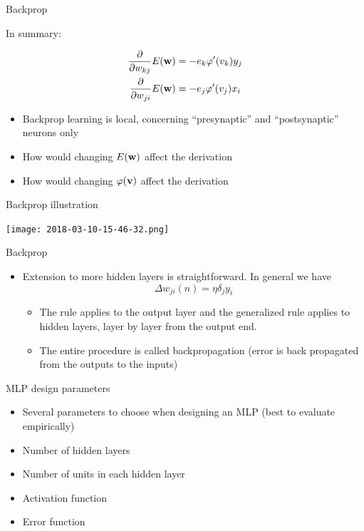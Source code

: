 \documentclass[notes]{beamer}
\providecommand{\tightlist}{%
  \setlength{\itemsep}{0pt}\setlength{\parskip}{0pt}}
\begin{document}
\begin{frame}{Backprop}

In summary:

\begin{align}
    \frac{\partial }{\partial w_{kj} } E(\mathbf{w}) & =   -e_k \varphi ' (v_k) y_j \\
    \frac{\partial }{\partial w_{ji}} E(\mathbf{w})  & =   -e_j \varphi ' (v_j) x_i
\end{align}

\begin{itemize}
\tightlist
\item
  Backprop learning is local, concerning ``presynaptic'' and
  ``postsynaptic'' neurons only
\item
  How would changing \(E(\mathbf{w})\) affect the derivation
\item
  How would changing \(\varphi (\mathbf{v})\) affect the derivation
\end{itemize}

\end{frame}

\begin{frame}{Backprop illustration}

\texttt{[image: 2018-03-10-15-46-32.png]} ~

\end{frame}

\begin{frame}{Backprop}

\begin{itemize}
\tightlist
\item
  Extension to more hidden layers is straightforward. In general we have
  \[ \Delta w_ {ji} (n) = \eta \delta _j y_i\]

  \begin{itemize}
  \tightlist
  \item
    The rule applies to the output layer and the generalized rule
    applies to hidden layers, layer by layer from the output end.
  \item
    The entire procedure is called backpropagation (error is back
    propagated from the outputs to the inputs)
  \end{itemize}
\end{itemize}

\end{frame}

\begin{frame}{MLP design parameters}

\begin{itemize}
\tightlist
\item
  Several parameters to choose when designing an MLP (best to evaluate
  empirically)
\item
  Number of hidden layers
\item
  Number of units in each hidden layer
\item
  Activation function
\item
  Error function
\end{itemize}

\end{frame}
\end{document}
